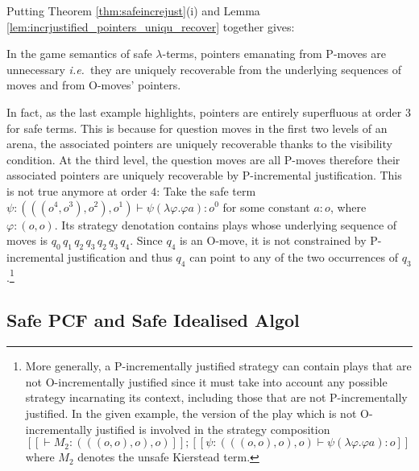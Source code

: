 \documentclass{llncs}
\newcommand{\sem}[1]{{[\![ #1 ]\!]}}
\begin{document}
Putting Theorem \ref{thm:safeincrejust}(i) and Lemma
\ref{lem:incrjustified_pointers_uniqu_recover} together gives:
\begin{proposition}
  \label{prop:safe_ptr_recoverable} In the game semantics of safe
  $\lambda$-terms, pointers emanating from P-moves are unnecessary
  {\it i.e.}~they are uniquely recoverable from the underlying sequences of
  moves and from O-moves' pointers.
\end{proposition}


In fact, as the last example highlights, pointers are entirely superfluous at 
order $3$ for safe terms. This is because for 
question moves in the first two levels of an arena, 
the associated pointers are uniquely recoverable thanks to 
the visibility condition. At the third level, the question moves are all P-moves therefore their associated pointers are uniquely recoverable by
P-incremental justification. This is not true anymore at order $4$:
Take the safe term $\psi:(((o^4,o^3),o^2),o^1) \vdash \psi (\lambda \varphi . \varphi a) : o^0$
for some constant $a:o$, where $\varphi:(o,o)$. Its strategy denotation contains plays whose underlying sequence of moves is $q_0 \, q_1 \, q_2 \, q_3 \, q_2 \, q_3 \, q_4$.
Since $q_4$ is an O-move, it is not constrained by 
P-incremental justification and thus $q_4$ can point to any of the two occurrences of $q_3$.\footnote{More generally,
a P-incrementally justified strategy can contain plays that are not O-incrementally justified since it must take into account any possible strategy incarnating its context, including those that are not P-incrementally justified.
In the given example, the version of the play which is not O-incrementally justified is involved in the strategy composition 
$\sem{ \vdash M_2 : (((o,o),o),o)} ; \sem{ \psi:(((o,o),o),o) \vdash \psi (\lambda \varphi . \varphi a):o}$ where $M_2$ denotes the unsafe Kierstead term.}

\subsection*{Safe PCF and Safe Idealised Algol}
\end{document}
